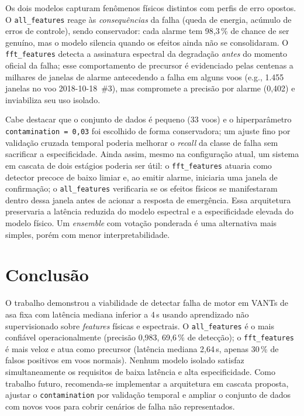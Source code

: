 \documentclass[12pt, a4paper]{article}
\begin{document}
Os dois modelos capturam fenômenos físicos distintos com perfis de erro opostos. O \texttt{all\_features} reage às \textit{consequências} da falha (queda de energia, acúmulo de erros de controle), sendo conservador: cada alarme tem 98{,}3\,\% de chance de ser genuíno, mas o modelo silencia quando os efeitos ainda não se consolidaram. O \texttt{fft\_features} detecta a assinatura espectral da degradação \textit{antes} do momento oficial da falha; esse comportamento de precursor é evidenciado pelas centenas a milhares de janelas de alarme antecedendo a falha em alguns voos (e.g., 1.455 janelas no voo 2018-10-18~\#3), mas compromete a precisão por alarme (0{,}402) e inviabiliza seu uso isolado.

Cabe destacar que o conjunto de dados é pequeno (33 voos) e o hiperparâmetro \texttt{contamination\,=\,0{,}03} foi escolhido de forma conservadora; um ajuste fino por validação cruzada temporal poderia melhorar o \textit{recall} da classe de falha sem sacrificar a especificidade. Ainda assim, mesmo na configuração atual, um sistema em cascata de dois estágios poderia ser útil: o \texttt{fft\_features} atuaria como detector precoce de baixo limiar e, ao emitir alarme, iniciaria uma janela de confirmação; o \texttt{all\_features} verificaria se os efeitos físicos se manifestaram dentro dessa janela antes de acionar a resposta de emergência. Essa arquitetura preservaria a latência reduzida do modelo espectral e a especificidade elevada do modelo físico. Um \textit{ensemble} com votação ponderada é uma alternativa mais simples, porém com menor interpretabilidade.

\section{Conclusão}

O trabalho demonstrou a viabilidade de detectar falha de motor em VANTs de asa fixa com latência mediana inferior a 4\,s usando aprendizado não supervisionado sobre \textit{features} físicas e espectrais. O \texttt{all\_features} é o mais confiável operacionalmente (precisão 0{,}983, 69{,}6\,\% de detecção); o \texttt{fft\_features} é mais veloz e atua como precursor (latência mediana 2{,}64\,s, apenas 30\,\% de falsos positivos em voos normais). Nenhum modelo isolado satisfaz simultaneamente os requisitos de baixa latência e alta especificidade. Como trabalho futuro, recomenda-se implementar a arquitetura em cascata proposta, ajustar o \texttt{contamination} por validação temporal e ampliar o conjunto de dados com novos voos para cobrir cenários de falha não representados.

{\footnotesize


}
\end{document}
